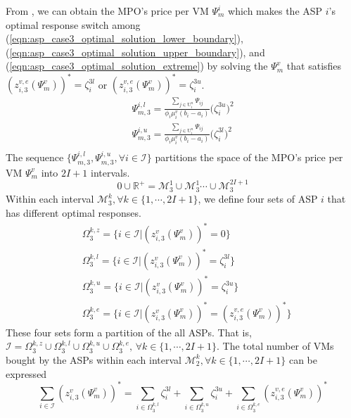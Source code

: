\documentclass[conference]{IEEEtran}
\begin{document}
From , we can obtain the MPO's price per VM $\Psi_m^i$ which makes the ASP $i$'s optimal response switch among (\ref{eqn:asp_case3_optimal_solution_lower_boundary}), (\ref{eqn:asp_case3_optimal_solution_upper_boundary}), and (\ref{eqn:asp_case3_optimal_solution_extreme}) by solving the $\Psi_m^v$ that satisfies $(z_{i,3}^{v,e}(\Psi_m^v))^* = \zeta_i^{3l}$ or $(z_{i,3}^{v,e}(\Psi_m^v))^* = \zeta_i^{3u}$. 
\begin{equation}
\begin{aligned}
\Psi_{m,3}^{i,l} = \frac{\sum_{j \in \mathrm{U}_i^n}\Psi_{ij}}{\phi_i \mu_i^v(b_i-a_i)}\big(\zeta_i^{3u}\big)^2 \\
\Psi_{m,3}^{i,u} = \frac{\sum_{j \in \mathrm{U}_i^n}\Psi_{ij}}{\phi_i \mu_i^v(b_i-a_i)}\big(\zeta_i^{3l}\big)^2 \\
\end{aligned}
\end{equation}
The sequence $\{\Psi_{m,3}^{i,l} , \Psi_{m,3}^{i,u}, \forall i \in \mathcal{I}\}$ partitions the space of the MPO's price per VM $\Psi_m^v$ into $2I + 1$ intervals.
\begin{equation}
0 \cup \mathbb{R}^{+} = \mathcal{M}_3^1 \cup \mathcal{M}_3^1 \cdots \cup \mathcal{M}_3^{2I+1}
\end{equation}
Within each interval $\mathcal{M}_3^k, \forall k \in \{1, \cdots, 2I+1\}$, we define four sets of ASP $i$ that has different optimal responses.
\begin{equation}
\begin{aligned}
&\Omega_3^{k,z} = \{i \in \mathcal{I}|(z_{i,3}^v(\Psi_m^v))^* = 0\} \\
&\Omega_3^{k,l} = \{i \in \mathcal{I}|(z_{i,3}^v(\Psi_m^v))^* = \zeta_i^{3l}\} \\
&\Omega_3^{k,u} = \{i \in \mathcal{I}|(z_{i,3}^v(\Psi_m^v))^* = \zeta_i^{3u}\} \\
&\Omega_3^{k,e} = \{i \in \mathcal{I}|(z_{i,3}^v(\Psi_m^v))^* = (z_{i,3}^{v,e}(\Psi_m^v))^*\} 
\end{aligned}
\end{equation}
These four sets form a partition of the all ASPs. That is, $\mathcal{I} = \Omega_3^{k,z} \cup \Omega_3^{k,l} \cup \Omega_3^{k,u} \cup \Omega_3^{k,e}, \, \forall k \in \{1, \cdots, 2I+1\}$. The total number of VMs bought by the ASPs within each interval $\mathcal{M}_2^k, \forall k \in \{1, \cdots, 2I+1\}$ can be expressed 
\begin{equation}\label{eqn:asp_case3_total_number_VM}
\sum_{i \in \mathcal{I}} (z_{i,3}^v(\Psi_m^v))^* =  \sum_{i\in \Omega_3^{k,l}}\zeta_i^{3l} + \sum_{i\in \Omega_3^{k,u}}\zeta_i^{3u} + \sum_{i \in \Omega_3^{k,e}}(z_{i,3}^{v,e}(\Psi_m^v))^* 
\end{equation}
\end{document}

